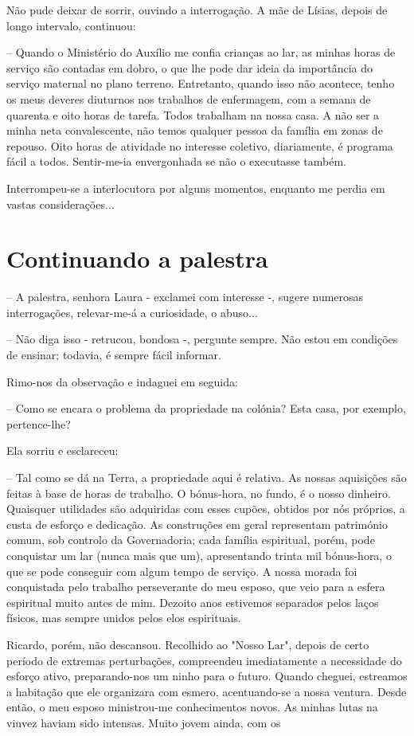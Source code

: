 \documentclass[portuguese,12pt,a4paper]{scrbook}
\begin{document}
	Não pude deixar de sorrir, ouvindo a interrogação. A mãe de Lísias, depois de longo intervalo, continuou:
	
	– Quando o Ministério do Auxílio me confia crianças ao lar, as minhas horas de serviço são contadas em dobro, o que lhe pode dar ideia da importância do serviço maternal no plano terreno. Entretanto, quando isso não acontece, tenho os meus deveres diuturnos nos trabalhos de enfermagem, com a semana de quarenta e oito horas de tarefa. Todos trabalham na nossa casa. A não ser a minha neta convalescente, não temos qualquer pessoa da família em zonas de repouso. Oito horas de atividade no interesse coletivo, diariamente, é programa fácil a todos. Sentir-me-ia envergonhada se não o executasse também.
	
	Interrompeu-se a interlocutora por alguns momentos, enquanto me perdia em vastas considerações...
	
	
	\chapter{Continuando a palestra}
	
	– A palestra, senhora Laura - exclamei com interesse -, sugere numerosas interrogações, relevar-me-á a curiosidade, o abuso...
	
	– Não diga isso - retrucou, bondosa -, pergunte sempre. Não estou em condições de ensinar; todavia, é sempre fácil informar.
	
	Rimo-nos da observação e indaguei em seguida:
	
	– Como se encara o problema da propriedade na colónia? Esta casa, por exemplo, pertence-lhe?
	
	Ela sorriu e esclareceu:
	
	– Tal como se dá na Terra, a propriedade aqui é relativa. As nossas aquisições são feitas à base de horas de trabalho. O bónus-hora, no fundo, é o nosso dinheiro. Quaisquer utilidades são adquiridas com esses cupões, obtidos por nós próprios, a custa de esforço e dedicação. As construções em geral representam património comum, sob controlo da Governadoria; cada família espiritual, porém, pode conquistar um lar (nunca mais que um), apresentando trinta mil bónus-hora, o que se pode conseguir com algum tempo de serviço. A nossa morada foi conquistada pelo trabalho perseverante do meu esposo, que veio para a esfera espiritual muito antes de mim. Dezoito anos estivemos separados pelos laços físicos, mas sempre unidos pelos elos espirituais.
	
	Ricardo, porém, não descansou. Recolhido ao "Nosso Lar", depois de certo período de extremas perturbações, compreendeu imediatamente a necessidade do esforço ativo, preparando-nos um ninho para o futuro. Quando cheguei, estreamos a habitação que ele organizara com esmero, acentuando-se a nossa ventura. Desde então, o meu esposo ministrou-me conhecimentos novos. As minhas lutas na viuvez haviam sido intensas. Muito jovem ainda, com os
	
\end{document}
